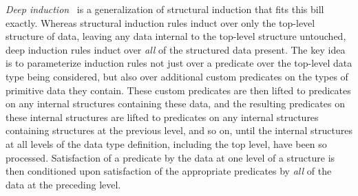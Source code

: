 \documentclass[sigplan,10pt,anonymous,review]{acmart}
\begin{document}
{\em Deep induction}~\cite{jp20} is a generalization of structural
induction that fits this bill exactly. Whereas structural induction
rules induct over only the top-level structure of data, leaving any
data internal to the top-level structure untouched, deep induction
rules induct over {\em all} of the structured data present. The key
idea is to parameterize induction rules not just over a predicate over
the top-level data type being considered, but also over additional
custom predicates on the types of primitive data they contain. These
custom predicates are then lifted to predicates on any internal
structures containing these data, and the resulting predicates on
these internal structures are lifted to predicates on any internal
structures containing structures at the previous level, and so on,
until the internal structures at all levels of the data type
definition, including the top level, have been so
processed. Satisfaction of a predicate by the data at one level of a
structure is then conditioned upon satisfaction of the appropriate
predicates by {\em all} of the data at the preceding level.
\end{document}
